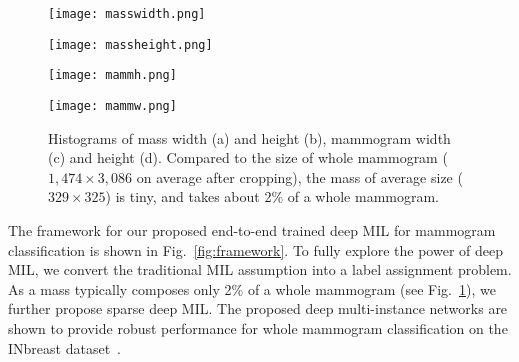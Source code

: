 \documentclass[runningheads,a4paper]{llncs}
\begin{document}
\begin{figure}[t]
	\setlength{\abovecaptionskip}{0.cm}
	\setlength{\belowcaptionskip}{-0.cm}
	\begin{center}
		\begin{minipage}{0.245\linewidth}
			\centerline{\texttt{[image: masswidth.png]}}
		\end{minipage}
		\begin{minipage}{0.245\linewidth}
			\centerline{\texttt{[image: massheight.png]}}
		\end{minipage}
		\begin{minipage}{0.245\linewidth}
			\centerline{\texttt{[image: mammh.png]}}
		\end{minipage}
		\begin{minipage}{0.245\linewidth}
			\centerline{\texttt{[image: mammw.png]}}
		\end{minipage}
		\caption{Histograms of mass width (a) and height (b), mammogram width (c) and height (d). Compared to the size of whole mammogram ($1,474 \times 3,086$ on average after cropping), the mass of average size ($329 \times 325$) is tiny, and takes about 2\% of a whole mammogram. }
		\label{fig:mass}
	\end{center}
\end{figure}

The framework for our proposed end-to-end trained deep MIL for mammogram classification is shown in Fig.~\ref{fig:framework}. To fully explore the power of deep MIL, we convert the traditional MIL assumption into a label assignment problem. As a mass typically composes only 2\% of a whole mammogram (see Fig.~\ref{fig:mass}), we further propose sparse deep MIL. The proposed deep multi-instance networks are shown to provide robust performance for whole mammogram classification on the INbreast dataset~\cite{moreira2012inbreast}.%
\end{document}

